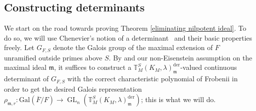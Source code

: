 \documentclass{amsart}
\theoremstyle{remark}
\numberwithin{equation}{subsection}
\newcommand{\m}{\frakm}
\newcommand{\frakm}{\mathfrak{m}}
\DeclareMathOperator{\GL}{GL}
\newcommand{\mf}{\mathfrak}
\renewcommand{\(}{\left(}
\renewcommand{\)}{\right)}
\begin{document}
\subsection{Constructing determinants}\label{determinants} We start on the road towards proving Theorem \ref{eliminating nilpotent ideal}. To do so, we will use Chenevier's notion of a determinant~\cite{chenevier} and their basic properties freely. Let $G_{F,S}$ denote the Galois group of the maximal extension of $F$ unramified outside primes above $S$. By \cite[Theorem 2.22(i)]{chenevier} and our non-Eisenstein assumption on the maximal ideal $\mf{m}$, it suffices to construct a $\mathbb{T}^S_M(K_M,\lambda)_\mf{m}^{\mathrm{der}}$-valued continuous determinant of $G_{F,S}$ with the correct characteristic polynomial of Frobenii in order to get the desired Galois representation $ \rho_{\m,r}\colon\mathrm{Gal}(\overline{F}/F)\to \GL_n\left(\mathbb{T}^S_M(K_M,\lambda)_\mf{m}^{\mathrm{der}}\right)$; this is what we will do.

\medskip
\end{document}
